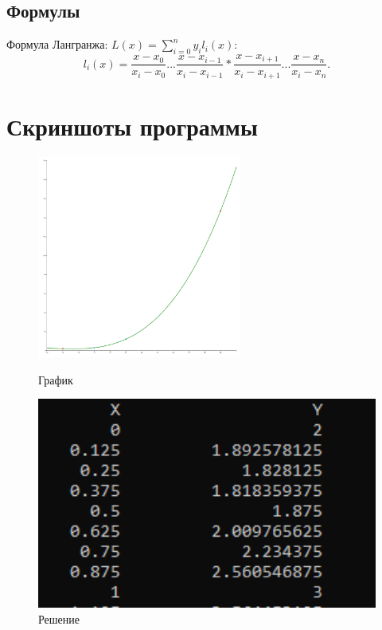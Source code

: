 \documentclass[12pt,a4paper]{scrartcl}
\begin{document}
\subsection{Формулы}
\label{sec:mathexample}

Формула Лангранжа: \(L(x)=\sum\limits_{i=0}^n y_{i}l_{i}(x)\):
\begin{equation}\label{eq:solv}
 l_{i}(x)=\frac{x-x_{0}}{x_{i}-x_{0}} ... \frac{x-x_{i-1}}{x_{i}-x_{i-1}}*\frac{x-x_{i+1}}{x_{i}-x_{i+1}} ... \frac{x-x_{n}}{x_{i}-x_{n}}.
\end{equation}



\section{Скриншоты программы}

\label{sec:picexample}
\begin{figure}[h]
	\begin{center}
    \begin{minipage}{0.39\linewidth}
	  \includegraphics[width=0.6\textwidth]{График.PNG}
	  \caption{График}\label{fig:par}
    \end{minipage}
    \hfill
    \begin{minipage}{0.39\linewidth}
	  \includegraphics[width=1\textwidth]{Решение.PNG}
	  \caption{Решение}\label{fig:par}
    \end{minipage}
    \end{center}
\end{figure}
\end{document}
